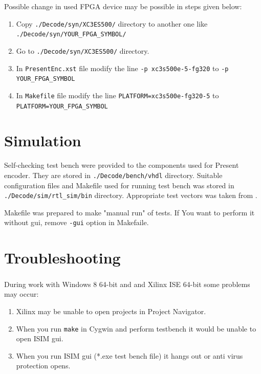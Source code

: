 \documentclass{gajewski}
\begin{document}
Possible change in used FPGA device may be possible in steps given below\footnotemark[1]:
\begin{enumerate}
    \item Copy \texttt{./Decode/syn/XC3ES500/} directory to another one like \texttt{./Decode/syn/YOUR\_FPGA\_SYMBOL/}
    \item Go to \texttt{./Decode/syn/XC3ES500/}  directory.
    \item In \texttt{PresentEnc.xst} file modify the line \texttt{-p xc3s500e-5-fg320} to \texttt{-p YOUR\_FPGA\_SYMBOL}
    \item In \texttt{Makefile} file modify the line \texttt{PLATFORM=xc3s500e-fg320-5} to \texttt{PLATFORM=YOUR\_FPGA\_SYMBOL}
\end{enumerate}



\newpage

\section{Simulation}

Self-checking test bench were provided to the components used for Present encoder. They are stored in \texttt{./Decode/bench/vhdl} directory. Suitable configuration files and Makefile used for running test bench was stored in 
\texttt{./Decode/sim/rtl\_sim/bin} directory. Appropriate test vectors was taken from \cite{PRESENT}.

Makefile was prepared to make "manual run" of tests. If You want to perform it without gui, remove \texttt{-gui} option in Makefaile.

\newpage

\section{Troubleshooting}

During work with Windows 8 64-bit and and Xilinx\textsuperscript{\textregistered} ISE 64-bit some problems may occur:

\begin{enumerate}
    \item Xilinx may be unable to open projects in Project Navigator.
    \item When you run \texttt{make} in Cygwin and perform testbench it would be unable to open ISIM gui.
    \item When you run ISIM gui  (*.exe test bench file) it hangs out or anti virus protection opens.
\end{enumerate}
\end{document}
